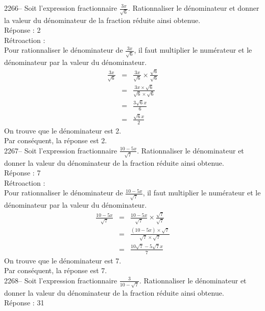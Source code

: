 \documentclass[letterpaper, 12pt]{article}
\begin{document}
2266-- Soit l'expression fractionnaire $\frac{3x}{\sqrt{6}}$. Rationnaliser le d\'enominateur et donner la valeur du d\'enominateur de la fraction r\'eduite ainsi obtenue.\\

R\'eponse : 2\\

R\'etroaction :\\
Pour rationnaliser le d\'enominateur de $\frac{3x}{\sqrt{6}}$, il faut multiplier le num\'erateur et le d\'enominateur par la valeur du d\'enominateur.
\begin{eqnarray*}
\frac{3x}{\sqrt{6}}&=&\frac{3x}{\sqrt{6}}\times\frac{\sqrt{6}}{\sqrt{6}}\\[2mm]
&=&\frac{3x\times\sqrt{6}}{\sqrt{6}\times\sqrt{6}}\\[2mm]
&=&\frac{3\sqrt{6}x}{6}\\[2mm]
&=&\frac{\sqrt{6}x}{2}
\end{eqnarray*}
On trouve que le d\'enominateur est 2.\\
Par cons\'equent, la r\'eponse est 2.\\

2267-- Soit l'expression fractionnaire $\frac{10-5x}{\sqrt{7}}$. Rationnaliser le d\'enominateur et donner la valeur du d\'enominateur de la fraction r\'eduite ainsi obtenue.\\

R\'eponse : 7\\

R\'etroaction :\\
Pour rationnaliser le d\'enominateur de $\frac{10-5x}{\sqrt{7}}$, il faut multiplier le num\'erateur et le d\'enominateur par la valeur du d\'enominateur.
\begin{eqnarray*}
\frac{10-5x}{\sqrt{7}}&=&\frac{10-5x}{\sqrt{7}}\times\frac{\sqrt{7}}{\sqrt{7}}\\[2mm]
&=&\frac{(10-5x)\times\sqrt{7}}{\sqrt{7}\times\sqrt{7}}\\[2mm]
&=&\frac{10\sqrt{7}-5\sqrt{7}x}{7}
\end{eqnarray*}
On trouve que le d\'enominateur est 7.\\
Par cons\'equent, la r\'eponse est 7.\\

2268--  Soit l'expression fractionnaire $\frac{3}{10-\sqrt{7}}$. Rationnaliser le d\'enominateur et donner la valeur du d\'enominateur de la fraction r\'eduite ainsi obtenue.\\

R\'eponse : 31\\
\end{document}
